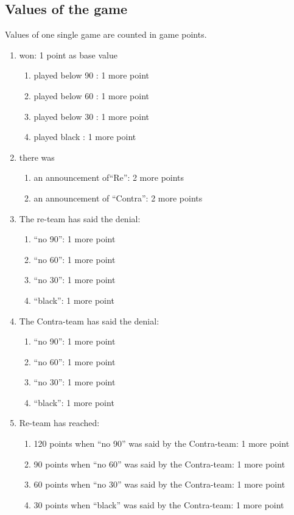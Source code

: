 \documentclass[12pt,a4paper]{article}
\begin{document}
\subsection{Values of the game} Values of one single game are
counted in game points.
\begin{enumerate}
\item won: 1 point as base value
\begin{enumerate}
\item played below 90 : 1 more point
\item played below 60 : 1 more point
\item played below 30 : 1 more point
\item played black : 1 more point
\end{enumerate}
\item there was
\begin{enumerate}
\item an announcement of"`Re"': 2 more points
\item an announcement of "`Contra"': 2 more points
\end{enumerate}
\item The re-team has said the denial:
\begin{enumerate}
\item "`no 90"': 1 more point
\item "`no 60"': 1 more point
\item "`no 30"': 1 more point
\item "`black"': 1 more point
\end{enumerate}
\item The Contra-team has said the denial:
\begin{enumerate}
\item "`no 90"': 1 more point
\item "`no 60"': 1 more point
\item "`no 30"': 1 more point
\item "`black"': 1 more point
\end{enumerate}
\item Re-team has reached:
\begin{enumerate}
\item 120 points when "`no 90"' was said by the Contra-team: 1 more point
\item 90 points when "`no 60"' was said by the Contra-team: 1 more point
\item 60 points when "`no 30"' was said by the Contra-team: 1 more point
\item 30 points when "`black"' was said by the Contra-team: 1 more point

\end{enumerate}
\end{enumerate}
\end{document}
